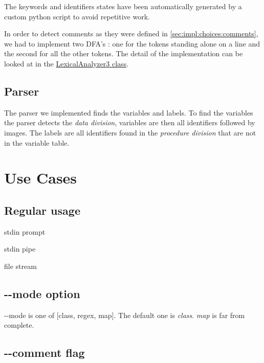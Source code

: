 \documentclass[a4paper,12pt]{article}
\begin{document}
The keywords and identifiers states have been automatically generated by a custom python script to avoid repetitive work.

In order to detect comments as they were defined in \ref{sec:impl:choices:comments}, we had to implement two DFA's : one for the tokens standing alone on a line and the second for all the other tokens. The detail of the implementation can be looked at in the \href{../more/src/cs/lang/LexicalAnalyzer3.java}{LexicalAnalyzer3 class}.
\subsection{Parser}

The parser we implemented finds the variables and labels. To find the variables the parser detects the \textit{data division}, variables are then all identifiers followed by images. The labels are all identifiers found in the \textit{procedure division} that are not in the variable table.


\newpage\cleardoublepage{}
\section{Use Cases}
\subsection{Regular usage}


stdin prompt


stdin pipe



file stream

\subsection{-{}-mode option}

-{}-mode is one of [class, regex, map]. The default one is \emph{class}.
\emph{map} is far from complete.

\subsection{-{}-comment flag}
\end{document}
